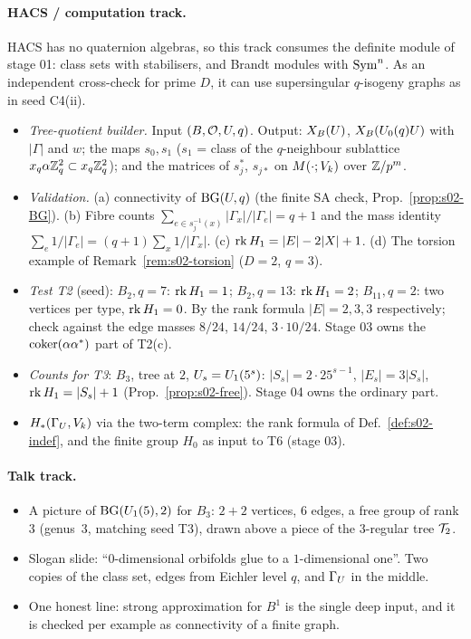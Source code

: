 \paragraph{HACS / computation track.}
HACS has no quaternion algebras, so this track consumes the definite module of stage 01: class sets with
stabilisers, and Brandt modules with $\mathrm{Sym}^n$. As an independent cross-check for prime $D$, it can use
supersingular $q$-isogeny graphs as in seed C4(ii).
\begin{itemize}
\item[H02.1] \emph{Tree-quotient builder.} Input $(B,\mathcal{O},U,q)$. Output: $X_B(U)$, $X_B(U_0(q)U)$ with $|\Gamma|$
  and $w$; the maps $s_0,s_1$ ($s_1$ = class of the $q$-neighbour sublattice
  $x_q\alpha\mathbb{Z}_q^2\subset x_q\mathbb{Z}_q^2$); and the matrices of $s_j^*$, $s_{j*}$ on $M(\cdot;V_k)$ over $\mathbb{Z}/p^m$.
\item[H02.2] \emph{Validation.} (a) connectivity of $\mathrm{BG}(U,q)$ (the finite SA check, Prop.~\ref{prop:s02-BG}).
  (b) Fibre counts $\sum_{e\in s_j^{-1}(x)}|\Gamma_x|/|\Gamma_e|=q+1$ and the mass identity
  $\sum_e1/|\Gamma_e|=(q+1)\sum_x1/|\Gamma_x|$. (c) $\operatorname{rk} H_1=|E|-2|X|+1$. (d) The torsion example of
  Remark~\ref{rem:s02-torsion} ($D=2$, $q=3$).
\item[H02.3] \emph{Test T2} (seed): $B_2,q=7$: $\operatorname{rk} H_1=1$; $B_2,q=13$: $\operatorname{rk} H_1=2$; $B_{11},q=2$: two vertices per
  type, $\operatorname{rk} H_1=0$. By the rank formula $|E|=2,3,3$ respectively; check against the edge masses $8/24$, $14/24$, $3\cdot10/24$.
  Stage 03 owns the $\operatorname{coker}(\alpha\alpha^*)$ part of T2(c).
\item[H02.4] \emph{Counts for T3}: $B_3$, tree at $2$, $U_s=U_1(5^s)$: $|S_s|=2\cdot25^{s-1}$, $|E_s|=3|S_s|$,
  $\operatorname{rk} H_1=|S_s|+1$ (Prop.~\ref{prop:s02-free}). Stage 04 owns the ordinary part.
\item[H02.5] $H_*(\Gamma_U,V_k)$ via the two-term complex: the rank formula of Def.~\ref{def:s02-indef}, and the
  finite group $H_0$ as input to T6 (stage 03).
\end{itemize}

\paragraph{Talk track.}
\begin{itemize}
\item[T02.1] A picture of $\mathrm{BG}(U_1(5),2)$ for $B_3$: $2+2$ vertices, $6$ edges, a free group of rank $3$
  (genus~$3$, matching seed T3), drawn above a piece of the $3$-regular tree $\mathcal{T}_2$.
\item[T02.2] Slogan slide: ``$0$-dimensional orbifolds glue to a $1$-dimensional one''. Two copies of the class
  set, edges from Eichler level $q$, and $\Gamma_U$ in the middle.
\item[T02.3] One honest line: strong approximation for $B^1$ is the single deep input, and it is checked per
  example as connectivity of a finite graph.
\end{itemize}

